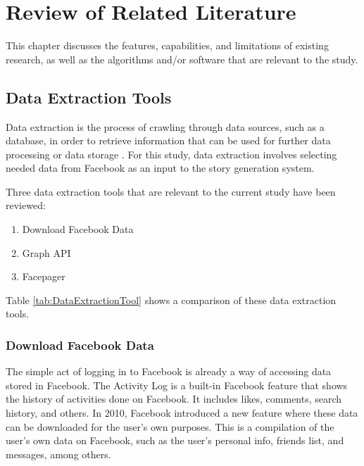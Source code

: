 %
%
%                 


\chapter{Review of Related Literature}
\label{sec:relatedlit}

This chapter discusses the features, capabilities, and limitations of existing research, as well as the algorithms and/or software that are relevant to the study. 

\section{Data Extraction Tools}
Data extraction is the process of crawling through data sources, such as a database, in order to retrieve information that can be used for further data processing or data storage \cite{Technopedia2016}. For this study, data extraction involves selecting needed data from Facebook as an input to the story generation system. 

Three data extraction tools that are relevant to the current study have been reviewed:
\begin{enumerate}
\item Download Facebook Data \cite{FacebookDownload, FacebookDownload2}
\item Graph API \cite{WeaverTarjan2013, FacebookGraphAndroid2016}
\item Facepager \cite{Facepager2016}
\end{enumerate}

Table \ref{tab:DataExtractionTool} shows a comparison of these data extraction tools.

\subsection{Download Facebook Data}
The simple act of logging in to Facebook is already a way of accessing data stored in Facebook. The Activity Log is a built-in Facebook feature that shows the history of activities done on Facebook. It includes likes, comments, search history, and others. In 2010, Facebook introduced a new feature where these data can be downloaded for the user's own purposes. This is a compilation of the user's own data on Facebook, such as the user's personal info, friends list, and messages, among others.

